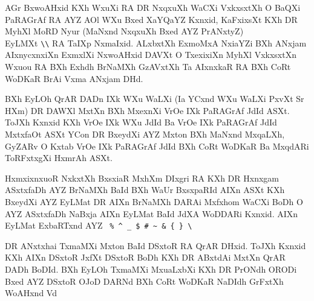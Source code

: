 AGr BxwoAHxid KXh WxuXi RA DR NxqxuXh WaCXi VxkxsxtXh O BaQXi PaRAGrAf RA AYZ AOl 
WXu Bxed XaYQaYZ Kxnxid, KaFxixsXt KXh DR MyhXl MoRD Nyur 
(MaNxnd NxqxuXh Bxed AYZ PrANxtyZ)\\ EyLMXt \verb.\\. RA TaIXp NxmaIxid.
ALxbxtXh ExmoMxA NxiaYZi BXh ANxjam AIxnycxnxiXn ExmxlXi NxwoAHxid DAVXt O TxexixiXn MyhXl VxkxsxtXn
Wxuou RA BXh Exhdh BrNaMXh \ylTXkFaRSXi{} GzAVxtXh Ta AIxnxkaR RA BXh CoRt 
WoDKaR BrAi Vxma ANxjam DHd.

 BXh EyLOh QrAR DADn IXk WXu WaLXi (Ia YCxnd WXu WaLXi PxvXt Sr HXm) 
  DR DAWXl MxtXn BXh MxexnXi VrOe IXk
  PaRAGrAf JdId ASXt.  ToJXh Kxnxid KXh VrOe IXk WXu JdId Ba VrOe IXk PaRAGrAf
  JdId MxtxfaOt ASXt YCon DR BxeydXi AYZ Mxton BXh MaNxnd MxqaLXh, GyZARv O Kxtab
 VrOe IXk PaRAGrAf JdId BXh CoRt WoDKaR Ba MxqdARi ToRFxtxgXi HxmrAh ASXt.

HxmxixnxuoR NxkxtXh BxsxiaR MxhXm DIxgri RA KXh DR Hxnxgam ASxtxfaDh AYZ BrNaMXh
\ylTXkFaRSXi{} BaId BXh WaUr BxsxpaRId AIXn ASXt KXh {\Sxiah BxeydXi AYZ EyLMat 
DR AIXn BrNaMXh DARAi Mxfxhom WaCXi BoDh O AYZ ASxtxfaDh NaBxja AIXn EyLMat 
BaId JdXA WoDDARi Kxnxid}. AIXn EyLMat ExbaRTxnd AYZ 
\verb. % ^ _ $ # ~ & { } \.


DR ANxtxhai TxmaMXi Mxton BaId DSxtoR  RA QrAR DHxid.  ToJXh Kxnxid
KXh AIXn DSxtoR JxfXt DSxtoR  BoDh KXh DR ABxtdAi MxtXn QrAR DADh
BoDId. BXh EyLOh TxmaMXi MxuaLxbXi KXh DR PrONdh ORODi Bxed AYZ DSxtoR
 OJoD DARNd BXh CoRt WoDKaR NaDIdh GrFxtXh WoAHxnd Vd


